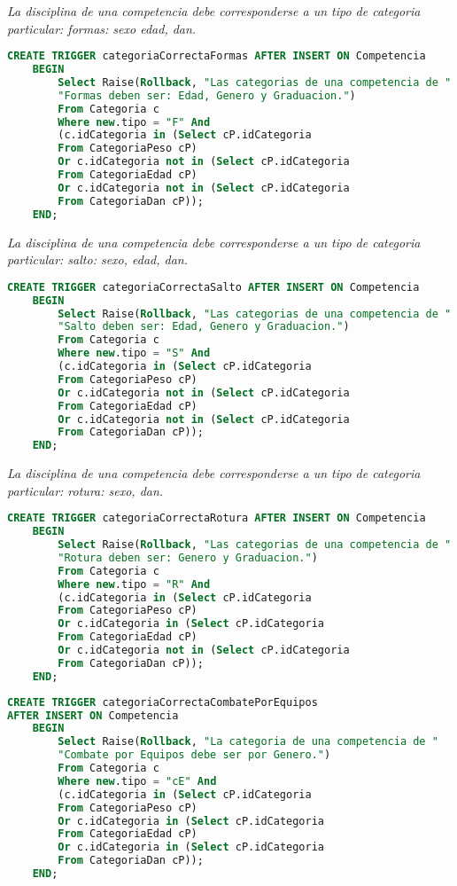 \emph{
  La disciplina de una competencia debe corresponderse a un tipo de categoria particular: formas: sexo edad, dan.
}

\begin{lstlisting}[language=SQL]
CREATE TRIGGER categoriaCorrectaFormas AFTER INSERT ON Competencia
    BEGIN
        Select Raise(Rollback, "Las categorias de una competencia de "
        "Formas deben ser: Edad, Genero y Graduacion.")
        From Categoria c
        Where new.tipo = "F" And
        (c.idCategoria in (Select cP.idCategoria 
        From CategoriaPeso cP)
        Or c.idCategoria not in (Select cP.idCategoria 
        From CategoriaEdad cP)
        Or c.idCategoria not in (Select cP.idCategoria 
        From CategoriaDan cP));
    END;
\end{lstlisting}
\emph{
  La disciplina de una competencia debe corresponderse a un tipo de categoria particular: salto: sexo, edad, dan.
}

\begin{lstlisting}[language=SQL]
CREATE TRIGGER categoriaCorrectaSalto AFTER INSERT ON Competencia
    BEGIN
        Select Raise(Rollback, "Las categorias de una competencia de "
        "Salto deben ser: Edad, Genero y Graduacion.")
        From Categoria c
        Where new.tipo = "S" And
        (c.idCategoria in (Select cP.idCategoria 
        From CategoriaPeso cP)
        Or c.idCategoria not in (Select cP.idCategoria 
        From CategoriaEdad cP)
        Or c.idCategoria not in (Select cP.idCategoria 
        From CategoriaDan cP));
    END;

\end{lstlisting}
\emph{
  La disciplina de una competencia debe corresponderse a un tipo de categoria particular: rotura: sexo, dan.
}

\begin{lstlisting}[language=SQL]
CREATE TRIGGER categoriaCorrectaRotura AFTER INSERT ON Competencia
    BEGIN
        Select Raise(Rollback, "Las categorias de una competencia de "
        "Rotura deben ser: Genero y Graduacion.")
        From Categoria c
        Where new.tipo = "R" And
        (c.idCategoria in (Select cP.idCategoria 
        From CategoriaPeso cP)
        Or c.idCategoria in (Select cP.idCategoria 
        From CategoriaEdad cP)
        Or c.idCategoria not in (Select cP.idCategoria 
        From CategoriaDan cP));
    END;

\end{lstlisting}
\emph{
}

\begin{lstlisting}[language=SQL]
CREATE TRIGGER categoriaCorrectaCombatePorEquipos 
AFTER INSERT ON Competencia
    BEGIN
        Select Raise(Rollback, "La categoria de una competencia de "
        "Combate por Equipos debe ser por Genero.")
        From Categoria c
        Where new.tipo = "cE" And
        (c.idCategoria in (Select cP.idCategoria 
        From CategoriaPeso cP)
        Or c.idCategoria in (Select cP.idCategoria 
        From CategoriaEdad cP)
        Or c.idCategoria in (Select cP.idCategoria 
        From CategoriaDan cP));
    END;

\end{lstlisting}

